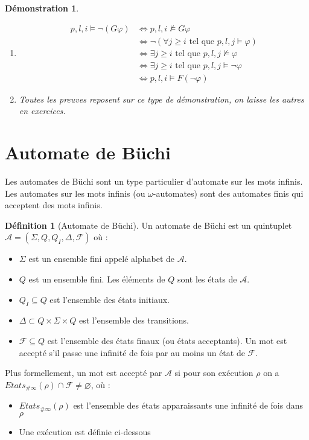 \documentclass[12pt,a4paper]{article}
\theoremstyle{plain}
\newtheorem{dem}{Démonstration}
\theoremstyle{definition}
\newtheorem{defi}{Définition}
\begin{document}
\begin{dem}
	\leavevmode 
	\begin{enumerate}
		\item[2.] 
		\begin{align*}
			 p,l,i \models \lnot (G \varphi) &\Leftrightarrow p,l,i \not \models G \varphi \\
			 &\Leftrightarrow \lnot (\forall j \geq i\textrm{ tel que } p,l,j \models \varphi) \\
			 &\Leftrightarrow \exists j \geq i \textrm{ tel que } p,l,j \not \models \varphi \\
			 &\Leftrightarrow \exists j \geq i \textrm{ tel que } p,l,j \models \lnot \varphi \\
			 &\Leftrightarrow p,l,i \models F (\lnot \varphi)
		\end{align*}	
		
		\item[] Toutes les preuves reposent sur ce type de démonstration, on laisse les autres en exercices.
	\end{enumerate}
\end{dem}



\section{Automate de Büchi}
Les automates de Büchi sont un type particulier d'automate sur les mots infinis.
Les automates sur les mots infinis (ou $\omega$-automates) sont des automates finis qui acceptent des mots infinis.

\begin{defi}[Automate de Büchi]
  Un automate de Büchi est un quintuplet $\mathcal{A}=(\Sigma, Q, Q_I, \Delta, \mathcal{F})$ où :
  \begin{itemize}
  \item $\Sigma$ est un ensemble fini appelé alphabet de $\mathcal{A}$.
  \item $Q$ est un ensemble fini. Les éléments de $Q$ sont les états de $\mathcal{A}$.
  \item $Q_I \subseteq Q$ est l'ensemble des états initiaux.
  \item $\Delta \subset Q \times \Sigma \times Q$ est l'ensemble des transitions.
  \item $\mathcal{F} \subseteq Q$ est l'ensemble des états finaux (ou états acceptants).
    Un mot est accepté s'il passe une infinité de fois par au moins un état de $\mathcal{F}$.
  \end{itemize}

  Plus formellement, un mot est accepté par $\mathcal{A}$ si pour son exécution $\rho$ on a $Etats_{\#\infty}(\rho) \cap \mathcal{F} \neq \varnothing$, où :
  \begin{itemize}
  \item $Etats_{\#\infty}(\rho)$ est l'ensemble des états apparaissants une infinité de fois dans $\rho$
  \item Une exécution est définie ci-dessous
  \end{itemize}
\end{defi}
\end{document}
